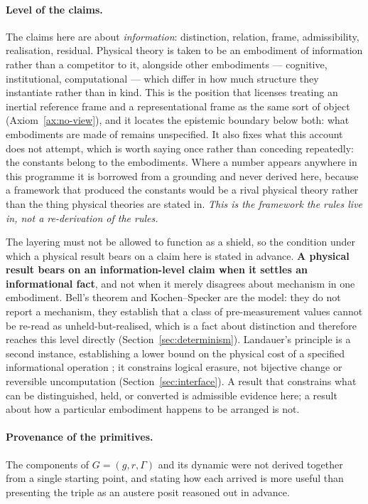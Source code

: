 \documentclass[11pt,a4paper]{article}
\theoremstyle{remark}\newtheorem{remark}[definition]{Remark}
\begin{document}
\paragraph{Level of the claims.}
The claims here are about \emph{information}: distinction, relation, frame, admissibility, realisation, residual. Physical theory is taken to be an embodiment of information rather than a competitor to it, alongside other embodiments --- cognitive, institutional, computational --- which differ in how much structure they instantiate rather than in kind. This is the position that licenses treating an inertial reference frame and a representational frame as the same sort of object (Axiom~\ref{ax:no-view}), and it locates the epistemic boundary below both: what embodiments are made of remains unspecified. It also fixes what this account does not attempt, which is worth saying once rather than conceding repeatedly: the constants belong to the embodiments. Where a number appears anywhere in this programme it is borrowed from a grounding and never derived here, because a framework that produced the constants would be a rival physical theory rather than the thing physical theories are stated in. \emph{This is the framework the rules live in, not a re-derivation of the rules.}

The layering must not be allowed to function as a shield, so the condition under which a physical result bears on a claim here is stated in advance. \textbf{A physical result bears on an information-level claim when it settles an informational fact}, and not when it merely disagrees about mechanism in one embodiment. Bell's theorem and Kochen--Specker are the model: they do not report a mechanism, they establish that a class of pre-measurement values cannot be re-read as unheld-but-realised, which is a fact about distinction and therefore reaches this level directly (Section~\ref{sec:determinism}). Landauer's principle is a second instance, establishing a lower bound on the physical cost of a specified informational operation \citep{landauer1961}; it constrains logical erasure, not bijective change or reversible uncomputation (Section~\ref{sec:interface}). A result that constrains what can be distinguished, held, or converted is admissible evidence here; a result about how a particular embodiment happens to be arranged is not.

\paragraph{Provenance of the primitives.}
The components of $G=(g,r,\Gamma)$ and its dynamic were not derived together from a single starting point, and stating how each arrived is more useful than presenting the triple as an austere posit reasoned out in advance.
\end{document}
